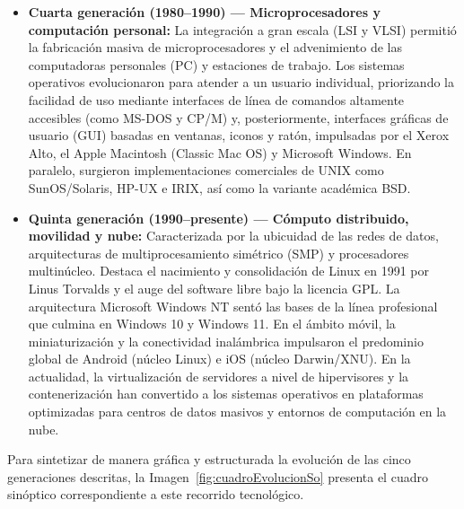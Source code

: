\documentclass[12pt]{article}
\begin{document}
\begin{itemize}[leftmargin=*]
    \item \textbf{Cuarta generación (1980--1990) --- Microprocesadores y computación personal:} La integración a gran escala (LSI y VLSI) permitió la fabricación masiva de microprocesadores y el advenimiento de las computadoras personales (PC) y estaciones de trabajo. Los sistemas operativos evolucionaron para atender a un usuario individual, priorizando la facilidad de uso mediante interfaces de línea de comandos altamente accesibles (como MS-DOS y CP/M) y, posteriormente, interfaces gráficas de usuario (GUI) basadas en ventanas, iconos y ratón, impulsadas por el Xerox Alto, el Apple Macintosh (Classic Mac OS) y Microsoft Windows. En paralelo, surgieron implementaciones comerciales de UNIX como SunOS/Solaris, HP-UX e IRIX, así como la variante académica BSD.
    \item \textbf{Quinta generación (1990--presente) --- Cómputo distribuido, movilidad y nube:} Caracterizada por la ubicuidad de las redes de datos, arquitecturas de multiprocesamiento simétrico (SMP) y procesadores multinúcleo. Destaca el nacimiento y consolidación de Linux en 1991 por Linus Torvalds y el auge del software libre bajo la licencia GPL. La arquitectura Microsoft Windows NT sentó las bases de la línea profesional que culmina en Windows 10 y Windows 11. En el ámbito móvil, la miniaturización y la conectividad inalámbrica impulsaron el predominio global de Android (núcleo Linux) e iOS (núcleo Darwin/XNU). En la actualidad, la virtualización de servidores a nivel de hipervisores y la contenerización han convertido a los sistemas operativos en plataformas optimizadas para centros de datos masivos y entornos de computación en la nube.
\end{itemize}

Para sintetizar de manera gráfica y estructurada la evolución de las cinco generaciones descritas, la Imagen~\ref{fig:cuadroEvolucionSo} presenta el cuadro sinóptico correspondiente a este recorrido tecnológico.
\end{document}
